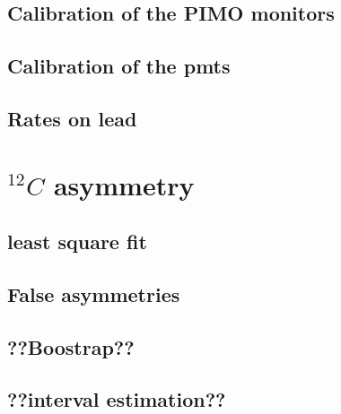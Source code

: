 \subsection{Calibration of the PIMO monitors}

\subsection{Calibration of the pmts}

\subsection{Rates on lead}

\section{ $^{12}C$ asymmetry}

\subsection{least square fit}

\subsection{False asymmetries}

\subsection{??Boostrap??}

\subsection{??interval estimation??}




